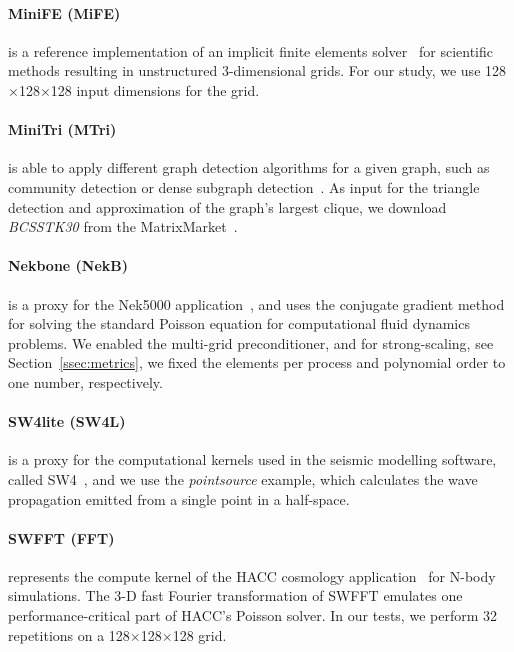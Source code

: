 \paragraph{MiniFE (MiFE)} is a reference implementation of an implicit finite elements
solver~\cite{heroux_improving_2009} for scientific methods resulting in unstructured 3-dimensional grids.
For our study, we use 128$\times$128$\times$128 input dimensions for the grid.

\paragraph{MiniTri (MTri)} is able to apply different graph detection algorithms for a given graph,
such as community detection or dense subgraph detection~\cite{wolf_task-based_2015}.
As input for the triangle detection and approximation of the graph's largest clique, we download
\textit{BCSSTK30} from the MatrixMarket~\cite{boisvert_matrix_1997}.

\paragraph{Nekbone (NekB)} is a proxy for the Nek5000 application~\cite{argonne_national_laboratory_nek5000_nodate}, and uses the conjugate
gradient method for solving the standard Poisson equation for computational fluid dynamics problems.
We enabled the multi-grid preconditioner, and for strong-scaling, see Section~\ref{ssec:metrics},
we fixed the elements per process and polynomial order to one number, respectively.

\paragraph{SW4lite (SW4L)} is a proxy for the computational kernels used in the seismic modelling
software, called SW4~\cite{petersson_users_2017}, and we use the \textit{pointsource} example, which calculates the wave
propagation emitted from a single point in a half-space.

\paragraph{SWFFT (FFT)} represents the compute kernel of the HACC cosmology application~\cite{habib_hacc:_2016}
for N-body simulations. The 3-D fast Fourier transformation of SWFFT emulates
one performance-critical part of HACC's Poisson solver. In our tests, we perform 32 repetitions on a
128$\times$128$\times$128 grid.

